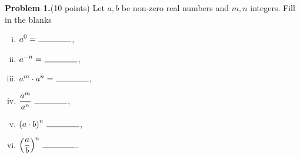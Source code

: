 \documentclass[12pt]{article}
\date{January 14, 2015}
\begin{document}
\bigskip

\vspace{.5in}

{\bf Problem 1.}(10 points)  
Let $a, b$ be non-zero real numbers and $m, n$ integers.
Fill in the blanks
\begin{enumerate}[(i)]
\item
  $\displaystyle{a^0 =\ \line(1,0){40}}$,
  \vspace{0.5in}
\item
  $\displaystyle{a^{-n} =\ \line(1,0){40}}$,
  \vspace{0.5in}
\item
  $\displaystyle{a^m \cdot a^n =\ \line(1,0){40}}$,
  \vspace{0.5in}
\item
  $\displaystyle{\frac{a^m}{a^n}\ \line(1,0){40}}$,
  \vspace{0.5in}
\item
  $\displaystyle{\left(a \cdot b\right)^n\ \line(1,0){40}}$,
  \vspace{0.5in}
\item
  $\displaystyle{\left(\frac{a}{b}\right)^n\ \line(1,0){40}}$.
\end{enumerate}
\end{document}
